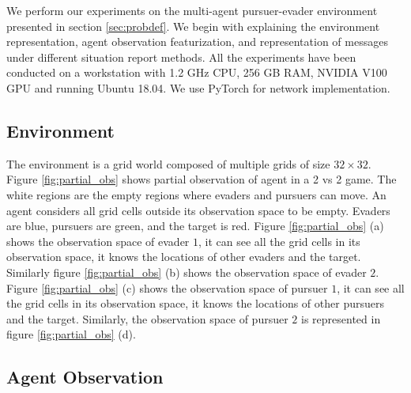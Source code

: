 \documentclass[conference]{IEEEtran}
\begin{document}
We perform our experiments on the multi-agent pursuer-evader environment presented in section \ref{sec:probdef}. We begin with explaining the environment representation, agent observation featurization, and representation of messages under different situation report methods. All the experiments have been conducted on a workstation with 1.2 GHz CPU, 256 GB RAM, NVIDIA V100 GPU and running Ubuntu 18.04. We use PyTorch \cite{paszke2017automatic} for network implementation.

\subsection{Environment}

The environment is a grid world composed of multiple grids of size $32\times32$. Figure \ref{fig:partial_obs} shows partial observation of agent in a 2 vs 2 game. The white regions are the empty regions where evaders and pursuers can move. An agent considers all grid cells outside its observation space to be empty. Evaders are blue, pursuers are green, and the target is red. Figure \ref{fig:partial_obs} (a) shows the observation space of evader $1$, it can see all the grid cells in its observation space, it knows the locations of other evaders and the target. Similarly figure \ref{fig:partial_obs} (b) shows the observation space of evader $2$. Figure \ref{fig:partial_obs} (c) shows the observation space of pursuer $1$, it can see all the grid cells in its observation space, it knows the locations of other pursuers and the target. Similarly, the observation space of pursuer $2$ is represented in figure \ref{fig:partial_obs} (d).

\subsection{Agent Observation}
\end{document}
